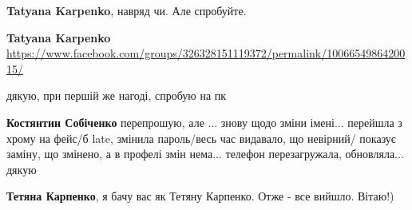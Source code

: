 \begin{itemize}
\begin{itemize}
 
\textbf{Tatyana Karpenko}, навряд чи. Але спробуйте.

 
\textbf{Tatyana Karpenko}
\url{https://www.facebook.com/groups/326328151119372/permalink/1006654986420015/}

 
дякую, при першій же нагоді, спробую на пк

 
\textbf{Костянтин Собіченко} перепрошую, але ... знову щодо зміни імені... перейшла з хрому на фейс/б late, змінила пароль/весь час видавало, що невірний/ показує заміну, що змінено, а в профелі змін нема... телефон перезагружала, обновляла... дякую

 
\textbf{Тетяна Карпенко}, я бачу вас як Тетяну Карпенко. Отже - все вийшло. Вітаю!)

 

\end{itemize}
\end{itemize}
